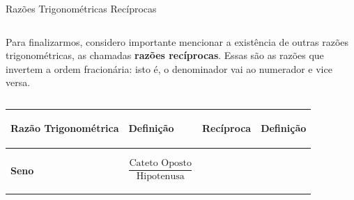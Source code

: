 \documentclass[aspectratio=169, t, 8pt]{beamer}
\begin{document}
    \begin{frame}{Razões Trigonométricas Recíprocas}
        \begin{columns}[totalwidth=.9\textwidth]   
            \begin{column}{\textwidth}
                Para finalizarmos, considero importante mencionar a existência de outras razões trigonométricas, as chamadas \textbf{razões recíprocas}. Essas são as razões que invertem a ordem fracionária: isto é, o denominador vai ao numerador e vice versa.
            \end{column}
        \end{columns}

        \vspace{1.4em}

        \centering
        \begin{columns}[c, totalwidth=.8\textwidth]
            \begin{column}{\textwidth}
                \begin{tabular}{m{} | m{} | m{} | m{}}
                    \hline
                    {
                        \begin{center}
                            \textbf{Razão Trigonométrica}
                        \end{center}
                    } & {
                        \begin{center}
                            \textbf{Definição}
                        \end{center}
                    } & {
                        \begin{center}
                            \textbf{Recíproca}
                        \end{center}
                    } & {
                        \begin{center}
                            \textbf{Definição}
                        \end{center}
                    }\\

                    \hline

                    {
                        \begin{center}
                            \textbf{Seno}
                        \end{center}
                    } &
                    {
                        \begin{center}
                            $$
                            \frac{
                                \text{Cateto Oposto}
                            }{
                                \text{Hipotenusa}
                            }
                            $$
                        \end{center}
                    } &


\end{tabular}
\end{column}
\end{columns}
\end{frame}
\end{document}
